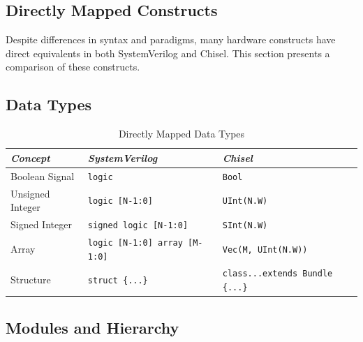 \subsection{Directly Mapped Constructs}

Despite differences in syntax and paradigms, many hardware constructs have direct equivalents in both SystemVerilog and Chisel. This section presents a comparison of these constructs.

\subsection{Data Types}

\begin{table}[h!]
\centering
\begin{tabular}{|l|l|l|}
\hline
\textit{Concept} & \textit{SystemVerilog} & \textit{Chisel} \\
\hline
Boolean Signal & \texttt{logic} & \texttt{Bool} \\
Unsigned Integer & \texttt{logic [N-1:0]} & \texttt{UInt(N.W)} \\
Signed Integer & \texttt{signed logic [N-1:0]} & \texttt{SInt(N.W)} \\
Array & \texttt{logic [N-1:0] array [M-1:0]} & \texttt{Vec(M, UInt(N.W))} \\
Structure & \texttt{struct \{...\}} & \texttt{class...extends Bundle \{...\}} \\
\hline
\end{tabular}
\caption{Directly Mapped Data Types}
\end{table}

\subsection{Modules and Hierarchy}

